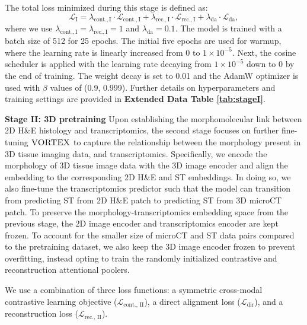 The total loss minimized during this stage is defined as:
\begin{equation}
    \mathcal{L}_{\mathrm{I}} = \lambda_{\text{cont.},\mathrm{I}}\cdot\mathcal{L}_{\text{cont.},\mathrm{I}} + 
\lambda_{\text{rec.},\mathrm{I}}\cdot\mathcal{L}_{\text{rec.},\mathrm{I}} +
\lambda_{\text{da}}\cdot\mathcal{L}_{\text{da}}, 
\end{equation}
where we use $\lambda_{\text{cont.},\mathrm{I}}=\lambda_{\text{rec.},\mathrm{I}}=1$ and $\lambda_{\text{da}}=0.1$.
The model is trained with a batch size of 512 for 25 epochs. The initial five epochs are used for warmup, where the learning rate is linearly increased from 0 to $1 \times 10^{-5}$. Next, the cosine scheduler is applied with the learning rate decaying from $1 \times 10^{-5}$ down to 0 by the end of training. The weight decay is set to 0.01 and the AdamW optimizer is used with $\beta$ values of (0.9, 0.999). Further details on hyperparameters and training settings are provided in \textbf{Extended Data Table \ref{tab:stageI}}. 


\noindent\textbf{Stage II: 3D pretraining}
Upon establishing the morphomolecular link between 2D H\&E histology and transcriptomics, the second stage focuses on further fine-tuning $\textsc{VORTEX}$ to capture the relationship between the morphology present in 3D tissue imaging data, and transcriptomics.
Specifically, we encode the morphology of 3D tissue image data with the 3D image encoder and align the embedding to the corresponding 2D H\&E and ST embeddings. In doing so, we also fine-tune the transcriptomics predictor such that the model can transition from predicting ST from 2D H\&E patch to predicting ST from 3D microCT patch. To preserve the morphology-transcriptomics embedding space from the previous stage, the 2D image encoder and transcriptomics encoder are kept frozen. To account for the smaller size of microCT and ST data pairs compared to the pretraining dataset, we also keep the 3D image encoder frozen to prevent overfitting, instead opting to train the randomly initialized contrastive and reconstruction attentional poolers.


We use a combination of three loss functions: a symmetric cross-modal contrastive learning objective ($\mathcal{L}_{\text{cont., II}}$), a direct alignment loss ($\mathcal{L}_{\text{dir}}$), and a reconstruction loss ($\mathcal{L}_{\text{rec., II}}$).


